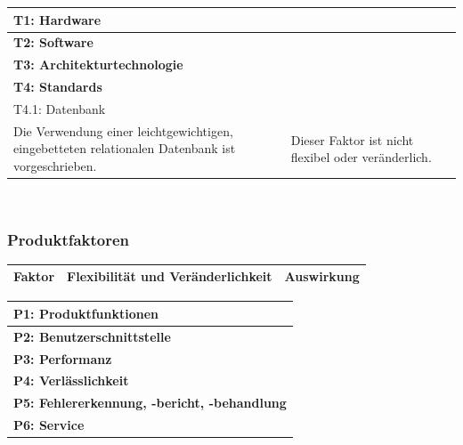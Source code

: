 \documentclass[fontsize=12pt,paper=a4,twoside]{scrartcl}
\begin{document}
\begin{tabularx}{\textwidth}{|p{3.5cm}|X|X|}
\hline
\multicolumn{3}{|l|}{\textbf{T1: Hardware}}\\\hline

\multicolumn{3}{|l|}{\textbf{T2: Software}}\\\hline

\multicolumn{3}{|l|}{\textbf{T3: Architekturtechnologie}}\\\hline

\multicolumn{3}{|l|}{\textbf{T4: Standards}}\\\hline
\multicolumn{3}{|l|}{T4.1: Datenbank}\\\hline
Die Verwendung einer leichtgewichtigen, eingebetteten relationalen Datenbank ist vorgeschrieben. & Dieser Faktor ist nicht flexibel oder veränderlich. & \\\hline

\end{tabularx}\\

\subsubsection{Produktfaktoren}
\begin{tabularx}{\textwidth}{|p{3.5cm}|X|X|}
\hline
\textbf{Faktor} & \textbf{Flexibilität und Veränderlichkeit} & \textbf{Auswirkung}\\\hline
\end{tabularx}\newline

\begin{tabularx}{\textwidth}{|p{3.5cm}|X|X|}
\hline
\multicolumn{3}{|l|}{\textbf{P1: Produktfunktionen}}\\\hline

\multicolumn{3}{|l|}{\textbf{P2: Benutzerschnittstelle}}\\\hline

\multicolumn{3}{|l|}{\textbf{P3: Performanz}}\\\hline

\multicolumn{3}{|l|}{\textbf{P4: Verlässlichkeit}}\\\hline

\multicolumn{3}{|l|}{\textbf{P5: Fehlererkennung, -bericht, -behandlung}}\\\hline

\multicolumn{3}{|l|}{\textbf{P6: Service}}\\\hline
\end{tabularx}\\
\end{document}
